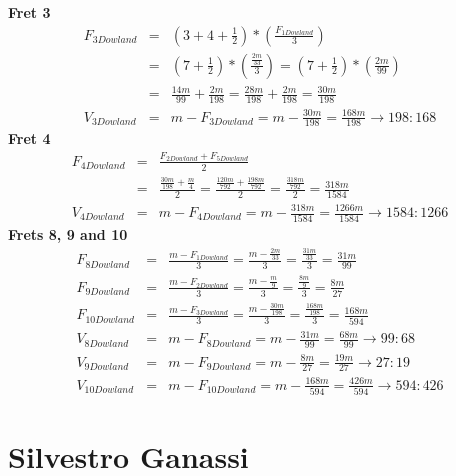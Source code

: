\textbf{Fret 3}
\begin{eqnarray*}
    F_{3Dowland}
        &=& ( 3 + 4 + \frac{1}{2} ) * ( \frac{F_{1Dowland}}{3} ) \\
        &=& ( 7 + \frac{1}{2} ) * ( \frac{\frac{2m}{33}}{3} )
        = ( 7 + \frac{1}{2} ) * ( \frac{2m}{99} ) \\
        &=& \frac{14m}{99} + \frac{2m}{198}
        = \frac{28m}{198} + \frac{2m}{198}
        = \frac{30m}{198} \\
    V_{3Dowland}
        &=& m - F_{3Dowland}
        = m - \frac{30m}{198}
        = \frac{168m}{198}
        \to 198:168
\end{eqnarray*}
\textbf{Fret 4}
\begin{eqnarray*}
    F_{4Dowland}
        &=& \frac{F_{2Dowland} + F_{5Dowland}}{2} \\
        &=& \frac{\frac{30m}{198} + \frac{m}{4}}{2}
        = \frac{\frac{120m}{792} + \frac{198m}{792}}{2}
        = \frac{\frac{318m}{792}}{2}
        = \frac{318m}{1584} \\
    V_{4Dowland}
        &=& m - F_{4Dowland}
        = m - \frac{318m}{1584}
        = \frac{1266m}{1584}
        \to 1584:1266
\end{eqnarray*}
\textbf{Frets 8, 9 and 10}
\begin{eqnarray*}
    F_{8Dowland}
        &=& \frac{m-F_{1Dowland}}{3}
        = \frac{m - \frac{2m}{33}}{3}
        = \frac{\frac{31m}{33}}{3}
        = \frac{31m}{99} \\
    F_{9Dowland}
        &=& \frac{m-F_{2Dowland}}{3}
        = \frac{m - \frac{m}{9}}{3}
        = \frac{\frac{8m}{9}}{3}
        = \frac{8m}{27} \\
    F_{10Dowland}
        &=& \frac{m-F_{3Dowland}}{3}
        = \frac{m - \frac{30m}{198}}{3}
        =\frac{\frac{168m}{198}}{3}
        =\frac{168m}{594} \\
    V_{8Dowland}
        &=& m - F_{8Dowland}
        = m - \frac{31m}{99}
        = \frac{68m}{99}
        \to 99:68 \\
    V_{9Dowland}
        &=& m - F_{9Dowland}
        = m - \frac{8m}{27}
        = \frac{19m}{27}
        \to 27:19 \\
    V_{10Dowland}
        &=& m - F_{10Dowland}
        = m - \frac{168m}{594}
        = \frac{426m}{594}
        \to 594:426
\end{eqnarray*}

\section{Silvestro Ganassi}

